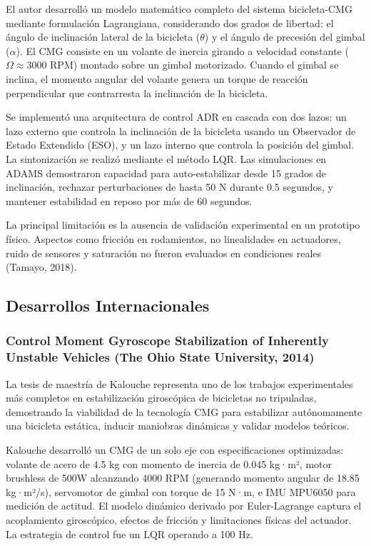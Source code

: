 \documentclass[12pt,letterpaper]{report}
\begin{document}
El autor desarrolló un modelo matemático completo del sistema bicicleta-CMG mediante formulación Lagrangiana, considerando dos grados de libertad: el ángulo de inclinación lateral de la bicicleta ($\theta$) y el ángulo de precesión del gimbal ($\alpha$). El CMG consiste en un volante de inercia girando a velocidad constante ($\Omega \approx 3000$ RPM) montado sobre un gimbal motorizado. Cuando el gimbal se inclina, el momento angular del volante genera un torque de reacción perpendicular que contrarresta la inclinación de la bicicleta.

Se implementó una arquitectura de control ADR en cascada con dos lazos: un lazo externo que controla la inclinación de la bicicleta usando un Observador de Estado Extendido (ESO), y un lazo interno que controla la posición del gimbal. La sintonización se realizó mediante el método LQR. Las simulaciones en ADAMS demostraron capacidad para auto-estabilizar desde 15 grados de inclinación, rechazar perturbaciones de hasta 50 N durante 0.5 segundos, y mantener estabilidad en reposo por más de 60 segundos.

La principal limitación es la ausencia de validación experimental en un prototipo físico. Aspectos como fricción en rodamientos, no linealidades en actuadores, ruido de sensores y saturación no fueron evaluados en condiciones reales (Tamayo, 2018).

\subsection{Desarrollos Internacionales}

\subsubsection{Control Moment Gyroscope Stabilization of Inherently Unstable Vehicles (The Ohio State University, 2014)}

La tesis de maestría de Kalouche representa uno de los trabajos experimentales más completos en estabilización giroscópica de bicicletas no tripuladas, demostrando la viabilidad de la tecnología CMG para estabilizar autónomamente una bicicleta estática, inducir maniobras dinámicas y validar modelos teóricos.

Kalouche desarrolló un CMG de un solo eje con especificaciones optimizadas: volante de acero de 4.5 kg con momento de inercia de 0.045 kg·m², motor brushless de 500W alcanzando 4000 RPM (generando momento angular de 18.85 kg·m²/s), servomotor de gimbal con torque de 15 N·m, e IMU MPU6050 para medición de actitud. El modelo dinámico derivado por Euler-Lagrange captura el acoplamiento giroscópico, efectos de fricción y limitaciones físicas del actuador. La estrategia de control fue un LQR operando a 100 Hz.
\end{document}
